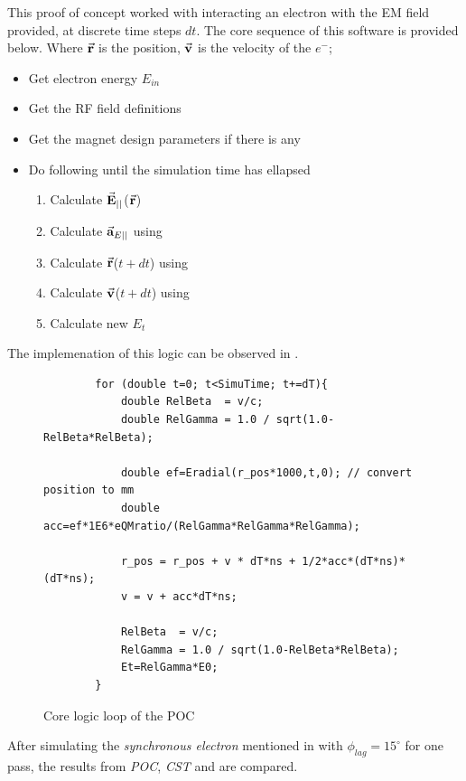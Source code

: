 \documentclass[a4paper,oneside,12pt]{report}
\numberwithin{equation}{chapter}
\begin{document}
This proof of concept worked with interacting an electron with the EM field provided, at discrete time steps $dt$. The core sequence of this software is provided below.
Where $\vec{\textbf{r}}$ is the position, $\vec{\textbf{v}}$ is the velocity of the $e^-$;
\begin{itemize}
    \item Get electron energy $E_{in}$
    \item Get the RF field definitions
    \item Get the magnet design parameters if there is any
    \item Do following until the simulation time has ellapsed
    \begin{enumerate}
        \item Calculate $\vec{\textbf{E}}_{||}$($\vec{\textbf{r}}$)
        \item Calculate $\vec{\textbf{a}}_{E ||}$ using 
        \item Calculate $\vec{\textbf{r}}$($t+dt$) using 
        \item Calculate $\vec{\textbf{v}}$($t+dt$) using 
        \item Calculate new $E_t$
    \end{enumerate}
\end{itemize}
The implemenation of this logic can be observed in . 
\begin{figure}[H]
    \begin{verbatim}
        for (double t=0; t<SimuTime; t+=dT){
            double RelBeta  = v/c;
            double RelGamma = 1.0 / sqrt(1.0-RelBeta*RelBeta);
        
            double ef=Eradial(r_pos*1000,t,0); // convert position to mm
            double acc=ef*1E6*eQMratio/(RelGamma*RelGamma*RelGamma); 
        
            r_pos = r_pos + v * dT*ns + 1/2*acc*(dT*ns)*(dT*ns);
            v = v + acc*dT*ns;

            RelBeta  = v/c;
            RelGamma = 1.0 / sqrt(1.0-RelBeta*RelBeta);
            Et=RelGamma*E0; 
        }
    \end{verbatim}
    \caption{Core logic loop of the POC}
    \label{fig:POC_core_logic}
\end{figure}
After simulating the \textit{synchronous electron} mentioned in  with $\phi_{lag}=15^\circ$ for one pass, the results from \textit{POC}, \textit{CST} and  are compared.
\end{document}
